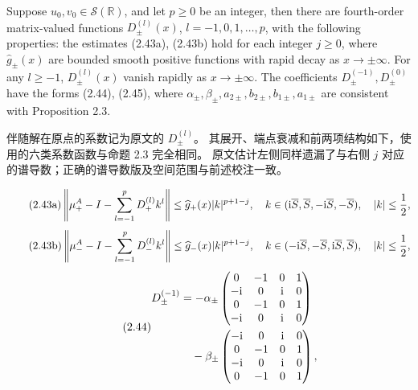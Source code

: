 \begin{paperpropositionen}\label{prop:2.7}
Suppose $u_0,v_0\in\mathcal S(\mathbb R)$, and let $p\ge0$ be an integer, then there are fourth-order matrix-valued functions $D_\pm^{(l)}(x)$, $l=-1,0,1,\ldots,p$, with the following properties:
the estimates (2.43a), (2.43b) hold for each integer $j\ge0$, where $\widehat g_\pm(x)$ are bounded smooth positive functions with rapid decay as $x\to\pm\infty$.
For any $l\ge-1$, $D_\pm^{(l)}(x)$ vanish rapidly as $x\to\pm\infty$.
The coefficients $D_\pm^{(-1)},D_\pm^{(0)}$ have the forms (2.44), (2.45), where $\alpha_\pm,\beta_\pm,a_{2\pm},b_{2\pm},b_{1\pm},a_{1\pm}$ are consistent with Proposition 2.3.
\end{paperpropositionen}
\begin{paperpropositioncn*}
伴随解在原点的系数记为原文的 $D_\pm^{(l)}$。
其展开、端点衰减和前两项结构如下，使用的六类系数函数与命题 2.3 完全相同。
原文估计左侧同样遗漏了与右侧 $j$ 对应的谱导数；正确的谱导数版及空间范围与前述校注一致。
\end{paperpropositioncn*}
\begin{equation}
\originaleq{2.43a}
\left\|\mu_+^A-I-\sum\limits_{l=-1}^pD_+^{(l)}k^l\right\|
\le\widehat g_+(x)|k|^{p+1-j},\quad
k\in(\ii\overline S,\overline S,-\ii\overline S,-\overline S),\quad |k|\le\dfrac{1}{2},
\end{equation}
\begin{equation}
\originaleq{2.43b}
\left\|\mu_-^A-I-\sum\limits_{l=-1}^pD_-^{(l)}k^l\right\|
\le\widehat g_-(x)|k|^{p+1-j},\quad
k\in(-\ii\overline S,-\overline S,\ii\overline S,\overline S),\quad |k|\le\dfrac{1}{2},
\end{equation}
\begin{equation}
\originaleq{2.44}
\begin{aligned}
D_\pm^{(-1)}
&=-\alpha_\pm\begin{pmatrix}0&-1&0&1\\-\ii&0&\ii&0\\0&-1&0&1\\-\ii&0&\ii&0\end{pmatrix}\\
&\quad-\beta_\pm\begin{pmatrix}-\ii&0&\ii&0\\0&-1&0&1\\-\ii&0&\ii&0\\0&-1&0&1\end{pmatrix},
\end{aligned}
\end{equation}
